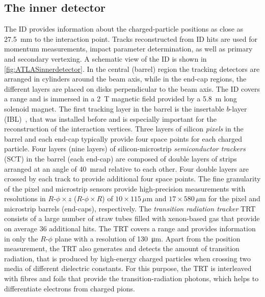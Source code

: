 \subsection{The inner detector}
\label{subsec:inner-detector}
The ID provides information about the charged-particle positions as close as \SI{27.5}{\milli\meter} to the interaction point.
Tracks reconstructed from ID hits are used for momentum measurements, impact parameter determination, as well as primary and secondary vertexing.
A schematic view of the ID is shown in \cref{fig:ATLASinnerdetector}.
In the central (barrel) region the tracking detectors are arranged in cylinders around the beam axis, while in the end-cap regions, the different layers are placed on disks perpendicular to the beam axis.
The ID covers a range  and is immersed in a \SI{2}{\tesla} magnetic field provided by a \SI{5.8}{\m} long solenoid magnet.
The first tracking layer in the barrel is the insertable $b$-layer (IBL)~\cite{ATLAS-TDR-19,PIX-2018-001}, that was installed before \RunTwo and is especially important for the reconstruction of the interaction vertices.
Three layers of silicon \emph{pixels} in the barrel and each end-cap typically provide four space points for each charged particle.
Four layers (nine layers) of silicon-microstrip \emph{semiconductor trackers} (SCT) in the barrel (each end-cap) are composed of double layers of strips arranged at an angle of \SI{40}{\milli\radian} relative to each other. Four double layers are crossed by each track to provide additional four space points.
The fine granularity of the pixel and microstrip sensors provide high-precision measurements with resolutions in $R$-$\phi \times z$ ($R$-$\phi \times R$) of $10 \times 115\,\mu\text{m}$ and $17 \times 580\,\mu\text{m}$ for the pixel and microstrip barrels (end-caps), respectively.
The \emph{transition radiation tracker} TRT consists of a large number of straw tubes filled with xenon-based gas that provide on average 36 additional hits. The TRT covers a range  and provides information in only the $R$-$\phi$ plane with a resolution of \SI{130}{\micro\meter}.
Apart from the position measurement, the TRT also generates and detects the amount of transition radiation, that is produced by high-energy charged particles when crossing two media of different dielectric constants. For this purpose, the TRT is interleaved with fibres and foils that provide the transition-radiation photons, which helps to differentiate electrons from charged pions.

